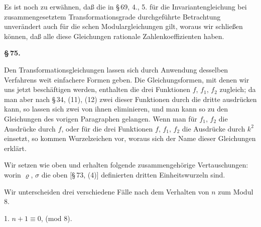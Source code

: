 Es ist noch zu erw\"ahnen, da\ss{} die in §\,69, 4., 5. f\"ur die Invariantengleichung bei zusammengesetztem Transformationsgrade durchgef\"uhrte Betrachtung unver\"andert auch f\"ur die schen Modulargleichungen gilt, woraus wir schlie\ss{}en k\"onnen, da\ss{} alle diese Gleichungen rationale Zahlenkoeffizienten haben.

\begin{center}
\textbf{§\,75.\quad {}}
\end{center}

Den Transformationsgleichungen lassen sich durch Anwendung desselben Verfahrens weit einfachere Formen geben. Die Gleichungsformen, mit denen wir uns jetzt besch\"aftigen werden, enthalten die drei Funktionen $f$, $f_1$, $f_2$ zugleich; da man aber nach §\,34, (11), (12) zwei dieser Funktionen durch die dritte ausdr\"ucken kann, so lassen sich zwei von ihnen eliminieren, und man kann so zu den Gleichungen des vorigen Paragraphen gelangen. Wenn man f\"ur $f_1$, $f_2$ die Ausdr\"ucke durch $f$, oder f\"ur die drei Funktionen $f$, $f_1$, $f_2$ die Ausdr\"ucke durch $k^2$ einsetzt, so kommen Wurzelzeichen vor, woraus sich der Name dieser Gleichungen erkl\"art.

Wir setzen wie oben
und erhalten folgende zusammengeh\"orige Vertauschungen:
worin $\varrho$, $\sigma$ die oben [§\,73, (4)] definierten dritten Einheitswurzeln sind.

Wir unterscheiden drei verschiedene F\"alle nach dem Verhalten von $n$ zum Modul 8.

1. $n+1\equiv 0$, (mod 8).
